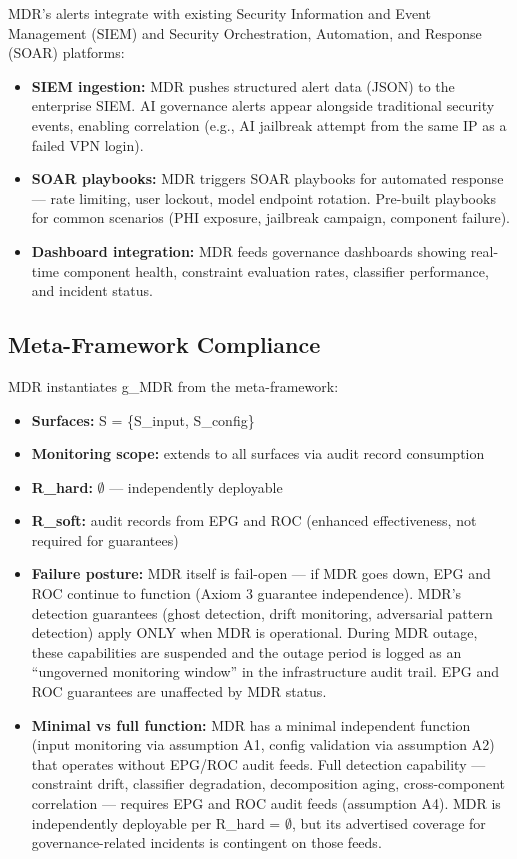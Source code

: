 MDR's alerts integrate with existing Security Information and Event Management (SIEM) and Security Orchestration, Automation, and Response (SOAR) platforms:

\begin{itemize}
  \item \textbf{SIEM ingestion:} MDR pushes structured alert data (JSON) to the enterprise SIEM. AI governance alerts appear alongside traditional security events, enabling correlation (e.g., AI jailbreak attempt from the same IP as a failed VPN login).
  \item \textbf{SOAR playbooks:} MDR triggers SOAR playbooks for automated response --- rate limiting, user lockout, model endpoint rotation. Pre-built playbooks for common scenarios (PHI exposure, jailbreak campaign, component failure).
  \item \textbf{Dashboard integration:} MDR feeds governance dashboards showing real-time component health, constraint evaluation rates, classifier performance, and incident status.
\end{itemize}


\subsection{Meta-Framework Compliance}


MDR instantiates g\_\allowbreak{}MDR from the meta-framework:

\begin{itemize}
  \item \textbf{Surfaces:} S = \{S\_\allowbreak{}input, S\_\allowbreak{}config\}
  \item \textbf{Monitoring scope:} extends to all surfaces via audit record consumption
  \item \textbf{R\_\allowbreak{}hard:} $\emptyset$ --- independently deployable
  \item \textbf{R\_\allowbreak{}soft:} audit records from EPG and ROC (enhanced effectiveness, not required for guarantees)
  \item \textbf{Failure posture:} MDR itself is fail-open --- if MDR goes down, EPG and ROC continue to function (Axiom 3 guarantee independence). MDR's detection guarantees (ghost detection, drift monitoring, adversarial pattern detection) apply ONLY when MDR is operational. During MDR outage, these capabilities are suspended and the outage period is logged as an ``ungoverned monitoring window'' in the infrastructure audit trail. EPG and ROC guarantees are unaffected by MDR status.
  \item \textbf{Minimal vs full function:} MDR has a minimal independent function (input monitoring via assumption A1, config validation via assumption A2) that operates without EPG/ROC audit feeds. Full detection capability --- constraint drift, classifier degradation, decomposition aging, cross-component correlation --- requires EPG and ROC audit feeds (assumption A4). MDR is independently deployable per R\_\allowbreak{}hard = $\emptyset$, but its advertised coverage for governance-related incidents is contingent on those feeds.
\end{itemize}




